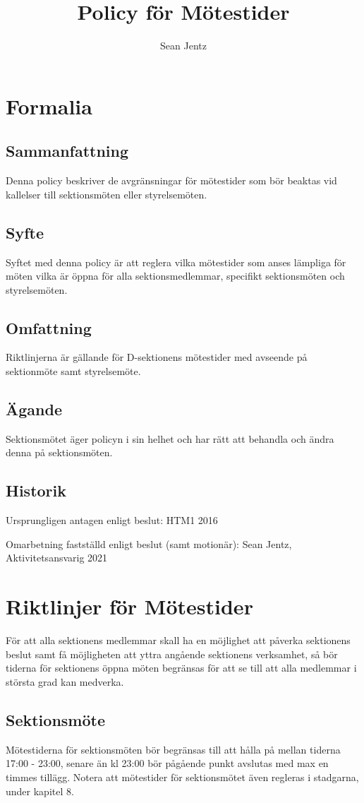 \documentclass[]{dsekprotokoll}
\title{Policy för Mötestider}
\author{Sean Jentz}
\begin{document}
\section{Formalia}

\subsection{Sammanfattning}
Denna policy beskriver de avgränsningar för mötestider som bör beaktas vid kallelser till sektionsmöten eller styrelsemöten.

\subsection{Syfte}
Syftet med denna policy är att reglera vilka mötestider som anses lämpliga för möten vilka är öppna för alla sektionsmedlemmar, specifikt sektionsmöten och styrelsemöten.

\subsection{Omfattning}
Riktlinjerna är gällande för D-sektionens mötestider med avseende på sektionmöte samt styrelsemöte.

\subsection{Ägande}
Sektionsmötet äger policyn i sin helhet och har rätt att behandla och ändra denna på sektionsmöten.

\subsection{Historik}
Ursprungligen antagen enligt beslut: HTM1 2016

Omarbetning fastställd enligt beslut (samt motionär): Sean Jentz, Aktivitetsansvarig 2021

\section{Riktlinjer för Mötestider}
För att alla sektionens medlemmar skall ha en möjlighet att påverka sektionens beslut samt få möjligheten att yttra angående sektionens verksamhet, så bör tiderna för sektionens öppna möten begränsas för att se till att alla medlemmar i största grad kan medverka.

\subsection{Sektionsmöte}
Mötestiderna för sektionsmöten bör begränsas till att hålla på mellan tiderna 17:00 -
23:00, senare än kl 23:00 bör pågående punkt avslutas med max en timmes tillägg.
Notera att mötestider för sektionsmötet även regleras i stadgarna, under kapitel 8.
\end{document}
